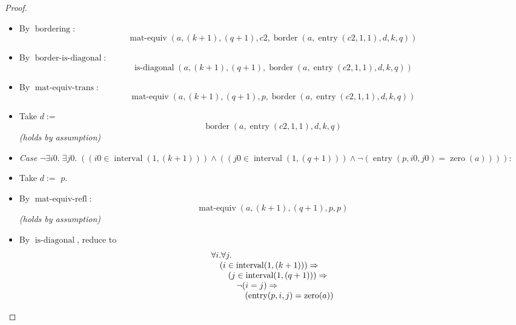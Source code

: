 \documentclass[11pt]{article}
\theoremstyle{plain}
\begin{document}
\begin{proof}
\begin{itemize}[leftmargin=2.8em, itemsep=4pt, parsep=1pt]
  \item[\textbf{89}] By $\operatorname{bordering}$:
\begin{equation*}
\operatorname{mat\text{-}equiv}(a, (k + 1), (q + 1), \mathit{c2}, \operatorname{border}(a, \operatorname{entry}(\mathit{c2}, 1, 1), d, k, q))
\end{equation*}

  \item[\textbf{90}] By $\operatorname{border\text{-}is\text{-}diagonal}$:
\begin{equation*}
\operatorname{is\text{-}diagonal}(a, (k + 1), (q + 1), \operatorname{border}(a, \operatorname{entry}(\mathit{c2}, 1, 1), d, k, q))
\end{equation*}

  \item[\textbf{91}] By $\operatorname{mat\text{-}equiv\text{-}trans}$:
\begin{equation*}
\operatorname{mat\text{-}equiv}(a, (k + 1), (q + 1), p, \operatorname{border}(a, \operatorname{entry}(\mathit{c2}, 1, 1), d, k, q))
\end{equation*}

  \item[\textbf{92--95}] Take $d :=$
\begin{equation*}
\operatorname{border}(a, \operatorname{entry}(\mathit{c2}, 1, 1), d, k, q)
\end{equation*}
  \emph{(holds by assumption)}
  \item[]\emph{Case} $\lnot \exists \mathit{i0}.\; \exists \mathit{j0}.\; ((\mathit{i0} \in \operatorname{interval}(1, (k + 1))) \wedge ((\mathit{j0} \in \operatorname{interval}(1, (q + 1))) \wedge \neg (\operatorname{entry}(p, \mathit{i0}, \mathit{j0}) = \operatorname{zero}(a))))$:
  \item[\textbf{96}] Take $d :=$ $p$.
  \item[\textbf{97--99}] By $\operatorname{mat\text{-}equiv\text{-}refl}$:
\begin{equation*}
\operatorname{mat\text{-}equiv}(a, (k + 1), (q + 1), p, p)
\end{equation*}
  \emph{(holds by assumption)}
  \item[\textbf{100}] By $\operatorname{is\text{-}diagonal}$, reduce to
\begin{equation*}
\begin{array}{@{}l@{}} \forall i. \forall j. \\ \quad (i \in \operatorname{interval}(1, (k + 1))) \Rightarrow  \\ \quad \quad (j \in \operatorname{interval}(1, (q + 1))) \Rightarrow  \\ \quad \quad \quad \neg (i = j) \Rightarrow  \\ \quad \quad \quad \quad (\operatorname{entry}(p, i, j) = \operatorname{zero}(a)) \end{array}
\end{equation*}


\end{itemize}
\end{proof}
\end{document}
